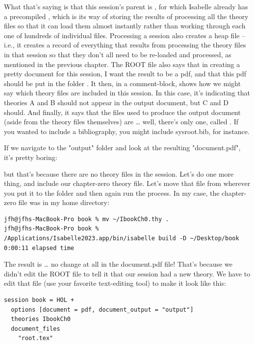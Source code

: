What that's saying is that this session's parent is , for which Isabelle already has a precompiled , which is its way of storing the results of processing all the theory files so that it can load them almost instantly rather than working through each one of hundreds of individual files. Processing a session also creates a heap file -- i.e., it creates a record of everything that results from processing the theory files in that session so that they don't all need to be re-loaded and processed, as mentioned in the previous chapter. The ROOT file also says that in creating a pretty document for this session, I want the result to be a pdf, and that this pdf should be put in the folder . It then, in a comment-block, shows how we might say which theory files are included in this session. In this case, it's indicating that theories A and B should not appear in the output document, but C and D should. And finally, it says that the files used to produce the output document (aside from the theory files themselves) are … well, there's only one, called . If you wanted to include a bibliography, you might include 
sys{root.bib}, for instance. 

If we navigate to the "output" folder and look at the resulting "document.pdf", it's pretty boring:


but that's because there are no theory files in the session. Let's do one more thing, and include our chapter-zero theory file. Let's move that file from wherever you put it to the  folder and then again run the  process. In my case, the chapter-zero file was in my home directory:
\begin{verbatim}
jfh@jfhs-MacBook-Pro book % mv ~/IbookCh0.thy .
jfh@jfhs-MacBook-Pro book % /Applications/Isabelle2023.app/bin/isabelle build -D ~/Desktop/book   
0:00:11 elapsed time
\end{verbatim}

The result is … no change at all in the document.pdf file! That's because we didn't edit the ROOT file to tell it that our session had a new theory. We have to edit that file (use your favorite text-editing tool) to make it look like this:

\begin{verbatim}
session book = HOL +
  options [document = pdf, document_output = "output"]
  theories IbookCh0
  document_files
    "root.tex"    
\end{verbatim}

